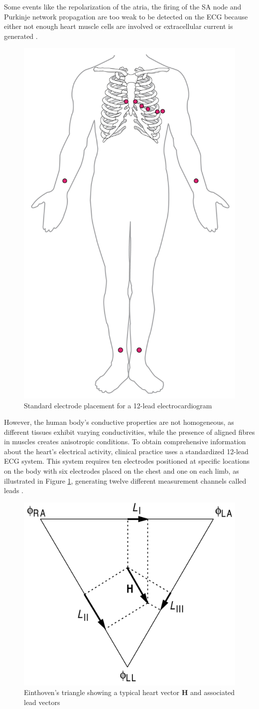 \noindent Some events like the repolarization of the atria, the firing of the SA node and Purkinje network propagation are too weak to be detected on the ECG because either not enough heart muscle cells are involved or extracellular current is generated \cite{keenerCardiacRhythmicity1998, m.rangayyanBiomedicalSignalAnalysis2002}. 

\begin{figure}
    \centering
    \includegraphics[width=0.25\linewidth]{Figures/1-intro/electrode_placement.jpg}
    \caption{Standard electrode placement for a 12-lead electrocardiogram \cite{openstaxCardiovascularSystemHeart2022}}
    \label{fig:electrode_placement}
\end{figure}

\noindent However, the human body's conductive properties are not homogeneous, as different tissues exhibit varying conductivities, while the presence of aligned fibres in muscles creates anisotropic conditions. To obtain comprehensive information about the heart's electrical activity, clinical practice uses a standardized 12-lead ECG system. This system requires ten electrodes positioned at specific locations on the body with six electrodes placed on the chest and one on each limb, as illustrated in Figure \ref{fig:electrode_placement}, generating twelve different measurement channels called leads \cite{keenerCardiacRhythmicity1998}.

\begin{figure}[h]
    \centering
    \includegraphics[width=0.35\linewidth]{Figures/1-intro/einthoven_triangle.png}
    \caption{Einthoven's triangle showing a typical heart vector \(\textbf{H}\) and associated lead vectors \cite{keenerCardiacRhythmicity1998}}
    \label{fig:einthoven_triangle}
\end{figure}


